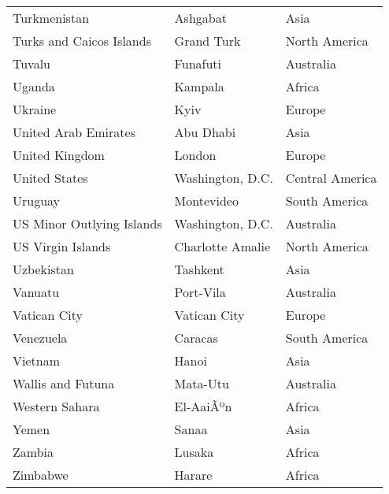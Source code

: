 \begin{longtable}{>{\raggedright}p{}>{\centering}p{}p{}}
Turkmenistan    & Ashgabat          & Asia\\
Turks and Caicos Islands & Grand Turk & North America\\
Tuvalu          & Funafuti          & Australia\\
Uganda          & Kampala           & Africa\\
Ukraine         & Kyiv              & Europe\\
United Arab Emirates & Abu Dhabi    & Asia\\
United Kingdom  & London            & Europe\\
United States   & Washington, D.C.  & Central America\\
Uruguay         & Montevideo        & South America\\
US Minor Outlying Islands & Washington, D.C. & Australia\\
US Virgin Islands & Charlotte Amalie & North America\\
Uzbekistan      & Tashkent          & Asia\\
Vanuatu         & Port-Vila         & Australia\\
Vatican City    & Vatican City      & Europe\\
Venezuela       & Caracas           & South America\\
Vietnam         & Hanoi             & Asia\\
Wallis and Futuna & Mata-Utu        & Australia\\
Western Sahara  & El-AaiÃºn         & Africa\\
Yemen           & Sanaa             & Asia\\
Zambia          & Lusaka            & Africa\\
Zimbabwe        & Harare            & Africa\\\hline
\end{longtable}